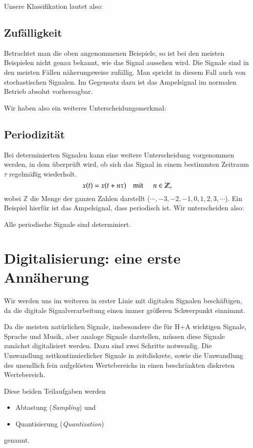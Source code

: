 Unsere Klassifikation lautet also:


\subsection{Zufälligkeit}
Betrachtet man die oben angenommenen Beispiele, so ist bei den meisten
Beispielen nicht genau bekannt, wie das Signal aussehen wird. Die
Signale sind in den meisten Fällen näherungsweise zufällig. Man
spricht in diesem Fall auch von stochastischen Signalen.
Im Gegensatz dazu ist das Ampelsignal im normalen Betrieb
absolut vorhersagbar.

Wir haben also ein weiteres Unterscheidungsmerkmal:

\subsection{Periodizität}
Bei determinierten Signalen kann eine weitere Unterscheidung vorgenommen werden,
in dem überprüft wird, ob sich das Signal in einem bestimmten Zeitraum $\tau$
regelmäßig wiederholt.
\[
    x(t) = x(t+n\tau) \quad\mathrm{mit}\;\, \quad n\in \mathbb{Z} ,
\]
wobei $\mathbb{Z}$ die Menge der ganzen Zahlen darstellt ($\cdots,-3,-2,-1,0,1,2,3,\cdots$).
Ein Beispiel hierfür ist das Ampelsignal, dass periodisch ist.
Wir unterscheiden also:

Alle periodische Signale sind determiniert.

\section{Digitalisierung: eine erste Annäherung}
Wir werden uns im weiteren in erster Linie mit
digitalen Signalen beschäftigen, da die digitale Signalverarbeitung
einen immer größeren Schwerpunkt einnimmt.

Da die meisten natürlichen Signale, insbesondere die für H+A wichtigen Signale, Sprache und
Musik, aber analoge Signale darstellen, müssen diese Signale zunächst digitalisiert werden.
Dazu sind zwei Schritte notwendig. Die Umwandlung zeitkontinuierlicher Signale in zeitdiskrete, sowie
die Umwandlung des unendlich fein aufgelösten Wertebereichs in einen beschränkten diskreten Wertebereich.

Diese beiden Teilaufgaben werden
\begin{itemize}
\item Abtastung ({\em Sampling}) und
\item Quantisierung ({\em Quantization})
\end{itemize}
genannt.


